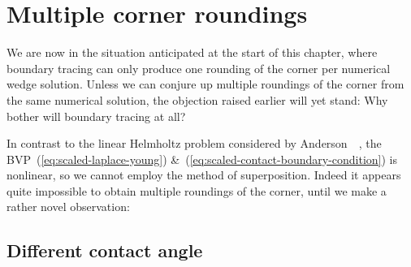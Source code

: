 \section{Multiple corner roundings}
\label{sec:moderate.multiple}

We are now in the situation anticipated at the start of this chapter,
where boundary tracing can only produce one rounding of the corner
per numerical wedge solution.
Unless we can conjure up multiple roundings of the corner
from the same numerical solution,
the objection raised earlier will yet stand:
Why bother will boundary tracing at all?

In contrast to the linear Helmholtz problem considered by
Anderson~\etal~\cite{anderson-2007-boundary-tracing-ii-applications},
the BVP~(\ref{eq:scaled-laplace-young})
\&~(\ref{eq:scaled-contact-boundary-condition})
is nonlinear,
so we cannot employ the method of superposition.
Indeed it appears quite impossible
to obtain multiple roundings of the corner,
until we make a rather novel observation:

\subsection{Different contact angle}
\label{sec:moderate.multiple.different}

